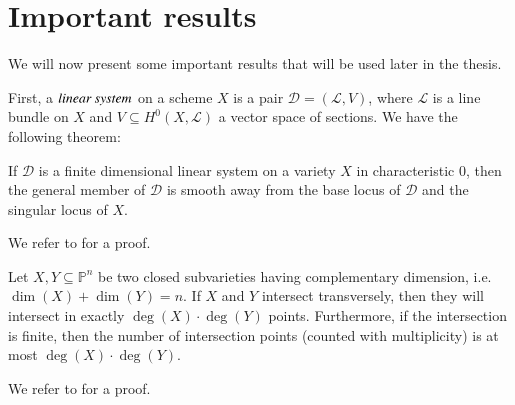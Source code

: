 
\section{Important results}
We will now present some important results that will be used later in the thesis.

First, a $\emph{linear system}$ on a scheme $X$ is a pair $\mathcal{D} = (\mathcal{L}, V)$, where $\mathcal{L}$ is a line bundle on $X$ and $V \subseteq H^0(X, \mathcal{L})$ a vector space of sections. We have the following theorem:
\begin{theorem}\label{thm:bertini}
    If $\mathcal{D}$ is a finite dimensional linear system on a variety $X$ in characteristic $0$, then the general member of $\mathcal{D}$ is smooth away from the base locus of $\mathcal{D}$ and the singular locus of $X$.
\end{theorem}
We refer to \cite[Corollary III.10.9]{Ha77} for a proof. 

\begin{theorem}\label{thm:bezout}
    Let $X, Y \subseteq \mathbb{P}^n$ be two closed subvarieties having complementary dimension, i.e. $\dim(X) + \dim(Y) = n$. If $X$ and $Y$ intersect transversely, then they will intersect in exactly $\deg(X) \cdot \deg(Y)$ points. Furthermore, if the intersection is finite, then the number of intersection points (counted with multiplicity) is at most $\deg(X) \cdot \deg(Y)$.
\end{theorem}
We refer to \cite[Corollary 2.4]{EH16} for a proof. 



